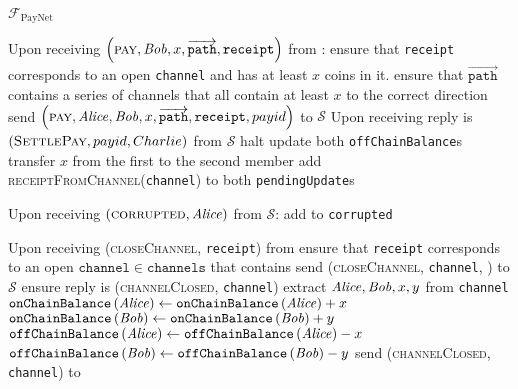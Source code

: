 \begin{functionality}{$\mathcal{F}_{\mathrm{PayNet}}$}
\begin{algorithmic}[1]
    \State Upon receiving $\left(\textsc{pay}, \mathit{Bob}, x,
    \overrightarrow{\mathtt{path}}, \mathtt{receipt}\right)$ from \alice:
    \Indent
      \State ensure that \texttt{receipt} corresponds to an open
      \texttt{channel} and \alice has at least $x$ coins in it.
      \State ensure that $\overrightarrow{\mathtt{path}}$ contains a series of
      channels that all contain at least $x$ to the correct direction 
      \State send $\left(\textsc{pay}, \mathit{Alice}, \mathit{Bob}, x,
      \overrightarrow{\mathtt{path}}, \mathtt{receipt}, payid\right)$ to $\mathcal{S}$
    \EndIndent
      \State Upon receiving reply is $\left(\textsc{SettlePay}, payid, Charlie\right)$ from $\mathcal{S}$
      \Indent
        \State halt 
      \Else
                \State update both \texttt{offChainBalance}s 
          \State transfer $x$ from the first to the second member 
          \State add \textsc{receiptFromChannel}(\texttt{channel})  to both
          \texttt{pendingUpdate}s
        \EndFor
      \EndIf
    \EndIndent
    \State

    \State Upon receiving $\left(\textsc{corrupted}, \mathit{Alice}\right)$ from
    $\mathcal{S}$:
    \Indent
      \State add \alice{} to \texttt{corrupted}
    \EndIndent
    \State

    \State Upon receiving (\textsc{closeChannel}, \texttt{receipt}) from \alice {}
    \Indent
      \State ensure that \texttt{receipt} corresponds to an open
      $\mathtt{channel} \in \mathtt{channels}$ that contains \alice
      \State send (\textsc{closeChannel}, \texttt{channel}, \alice) to
      $\mathcal{S}$
      \State ensure reply is (\textsc{channelClosed}, \texttt{channel})
      \State extract $\mathit{Alice}, \mathit{Bob}, x, y$ from \texttt{channel}
      \State $\mathtt{onChainBalance}\left(\mathit{Alice}\right) \gets
      \mathtt{onChainBalance}\left(\mathit{Alice}\right) + x$
      \State {}
      \State $\mathtt{onChainBalance}\left(\mathit{Bob}\right) \gets
      \mathtt{onChainBalance}\left(\mathit{Bob}\right) + y$
      \State $\mathtt{offChainBalance}\left(\mathit{Alice}\right) \gets
      \mathtt{offChainBalance}\left(\mathit{Alice}\right) - x$
      \State $\mathtt{offChainBalance}\left(\mathit{Bob}\right) \gets
      \mathtt{offChainBalance}\left(\mathit{Bob}\right) - y$
      \State send (\textsc{channelClosed}, \texttt{channel}) to \alice
    \EndIndent
    \State


\end{algorithmic}
\end{functionality}
